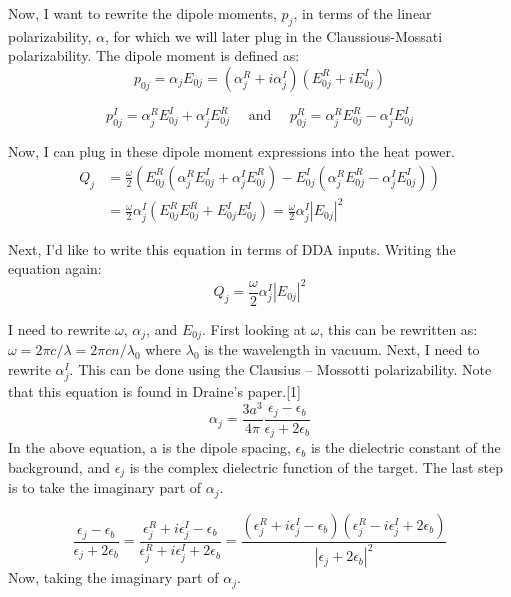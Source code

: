 \documentclass[12pt]{article}
\begin{document}
Now, I want to rewrite the dipole moments, $p_j$, in terms of the linear polarizability, $\alpha$, for which we will later plug in the Claussious-Mossati polarizability. The dipole moment is defined as:
\begin{equation}
p_{0j} = \alpha_j E_{0j} = \left ( \alpha_j^R + i \alpha_j^I \right ) \left ( E_{0j}^R + i E_{0j}^I \right )
\end{equation}

\begin{equation*}
p_{0j}^I = \alpha_j^R  E_{0j}^I + \alpha_j^I  E_{0j}^R \quad \textrm{ and } \quad p_{0j}^R = \alpha_j^R  E_{0j}^R - \alpha_j^I  E_{0j}^I
\end{equation*}

Now, I can plug in these dipole moment expressions into the heat power.
\begin{equation}
\begin{split}
Q_j &= \frac{\omega}{2} \left ( E_{0j}^R( \alpha_j^R  E_{0j}^I + \alpha_j^I  E_{0j}^R)  -  E_{0j}^I (\alpha_j^R  E_{0j}^R - \alpha_j^I  E_{0j}^I)   \right)  \\
&= \frac{\omega}{2} \alpha_j^I \left ( E_{0j}^R E_{0j}^R + E_{0j}^I E_{0j}^I  \right ) = \frac{\omega}{2} \alpha_j^I \left |E_{0j} \right | ^2
\end{split}
\end{equation}

Next, I'd like to write this equation in terms of DDA inputs. Writing the equation again: 
\begin{equation}
Q_j = \frac{\omega}{2} \alpha_j^I \left |E_{0j} \right | ^2
\end{equation}

I need to rewrite $\omega$, $\alpha_j$, and $E_{0j}$. First looking at $\omega$, this can be rewritten as: $\omega = 2 \pi c / \lambda = 2 \pi c n /\lambda_0$ where $\lambda_0$ is the wavelength in vacuum. Next, I need to rewrite $\alpha_j^I$. This can be done using the Clausius -- Mossotti polarizability. Note that this equation is found in Draine's paper.[1] 
\begin{equation}
\alpha_j = \frac{3a^3 }{4 \pi} \frac{ \epsilon_j - \epsilon_b}{\epsilon_j + 2 \epsilon_b} 
\end{equation}
In the above equation, a is the dipole spacing, $\epsilon_b$ is the dielectric constant of the background, and $\epsilon_j$ is the complex dielectric function of the target. The last step is to take the imaginary part of $\alpha_j$. 

\begin{equation}
\frac{ \epsilon_j - \epsilon_b}{\epsilon_j + 2 \epsilon_b} = \frac{\epsilon_j^R + i \epsilon_j^I - \epsilon_b}{\epsilon_j^R + i \epsilon_j^I + 2 \epsilon_b} =  \frac{(\epsilon_j^R + i \epsilon_j^I - \epsilon_b)(\epsilon_j^R - i \epsilon_j^I + 2 \epsilon_b)}{ \left | \epsilon_j + 2 \epsilon_b \right | ^2}
\end{equation}
Now, taking the imaginary part of $\alpha_j$.
\end{document}
